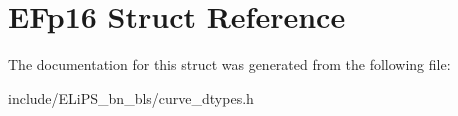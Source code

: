 \hypertarget{struct_e_fp16}{}\section{E\+Fp16 Struct Reference}
\label{struct_e_fp16}


The documentation for this struct was generated from the following file\+:\begin{DoxyCompactItemize}
\item 
include/\+E\+Li\+P\+S\+\_\+bn\+\_\+bls/curve\+\_\+dtypes.\+h\end{DoxyCompactItemize}
